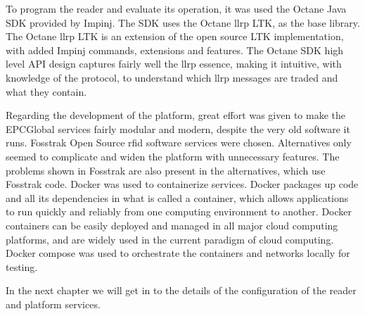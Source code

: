 To program the reader and evaluate its operation, it was used the Octane Java SDK provided by Impinj. 
The SDK uses the Octane \ac{llrp} LTK, as the base library. The Octane \ac{llrp} LTK is an extension of the open source LTK implementation, with added Impinj commands, extensions and features.
The Octane SDK high level API design captures fairly well the \ac{llrp} essence, making it intuitive, with knowledge of the protocol, to understand which \ac{llrp} messages are traded and what they contain.

Regarding the development of the platform, great effort was given to make the EPCGlobal services fairly modular and modern, despite the very old software it runs.
Fosstrak Open Source \ac{rfid} software services were chosen. Alternatives only seemed to complicate and widen the platform with unnecessary features. The problems shown in Fosstrak are also present in the alternatives, which use Fosstrak code.
Docker was used to containerize services. 
Docker packages up code and all its dependencies in what is called a container, which allows applications to run quickly and reliably from one computing environment to another. Docker containers can be easily deployed and managed in all major cloud computing platforms, and are widely used in the current paradigm of cloud computing.
Docker compose was used to orchestrate the containers and networks locally for testing.

In the next chapter we will get in to the details of the configuration of the reader and platform services.
